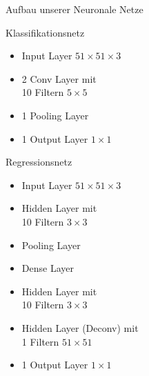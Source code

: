 \begin{frame}{Aufbau unserer Neuronale Netze}
	\centering
\begin{minipage}{0.49\textwidth}
\centering
Klassifikationsnetz

\begin{itemize}
\item Input Layer $51 \times 51 \times 3$
\item 2 Conv Layer mit \\ 10 Filtern $5 \times 5$
\item 1 Pooling Layer
\item 1 Output Layer $1 \times 1$
\vspace{7em}
\end{itemize}
\end{minipage}
\begin{minipage}{0.49\textwidth}
\centering
Regressionsnetz

\begin{itemize}
\item Input Layer $51 \times 51 \times 3$
\item Hidden Layer mit \\ 10 Filtern $3 \times 3$
\item Pooling Layer
\item Dense Layer
\item Hidden Layer mit \\ 10 Filtern $3 \times 3$
\item Hidden Layer (Deconv) mit \\ 1 Filtern $51 \times 51$
\item 1 Output Layer $1 \times 1$
\end{itemize}

\end{minipage}

\end{frame}
